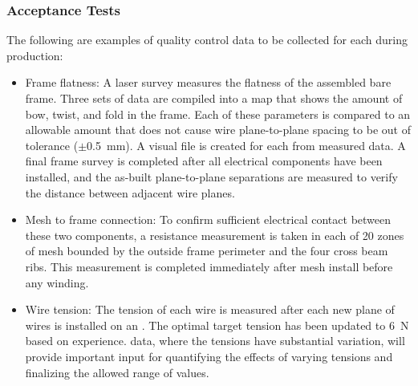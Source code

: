 \subsubsection{ Acceptance Tests} 

The following are examples of quality control data to be collected for each  during production:  

\begin{itemize}

\item Frame flatness: A laser survey measures the flatness of the assembled bare frame. Three sets of data are compiled into a map that shows the amount of bow, twist, and fold in the frame. Each of these parameters is compared to an allowable amount that does not cause wire plane-to-plane spacing to be out of tolerance ($\pm$\SI{0.5}{mm}).  A visual file is created for each  from measured data. A final frame survey is completed after all electrical components have been installed, and the as-built plane-to-plane separations are measured to verify the distance between adjacent wire planes.

\item Mesh to frame connection: To confirm sufficient electrical contact between these two components, a resistance measurement is taken in each of \num{20} zones of mesh bounded by the outside frame perimeter and the four cross beam ribs. This measurement is completed immediately after mesh install before any winding.

\item Wire tension: The tension of each wire is measured after each new plane of wires is installed on an . The optimal target tension has been updated to \SI{6}{N} based on  experience.   data, where the tensions have substantial variation, will provide important input for quantifying the effects of varying tensions and finalizing the allowed range of values.  
\end{itemize}


